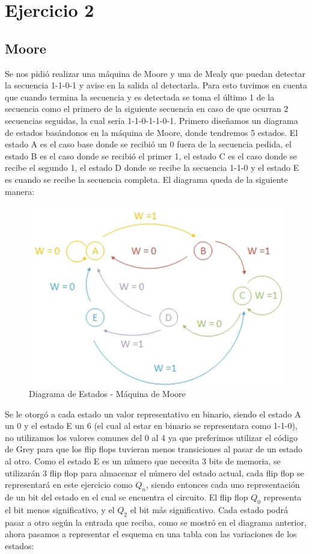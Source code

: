 \section*{Ejercicio 2}

\subsection*{Moore}
Se nos pidi\'o realizar una m\'aquina de Moore y una de Mealy que puedan detectar la secuencia 1-1-0-1 y avise en la salida al detectarla. Para esto tuvimos en cuenta que cuando termina la secuencia y es detectada se toma el \'ultimo 1 de la secuencia como el primero de la siguiente secuencia en caso de que ocurran 2 secuencias seguidas, la cual ser\'ia 1-1-0-1-1-0-1. Primero diseñamos un diagrama de estados basándonos en la m\'aquina de Moore, donde tendremos 5 estados. El estado A es el caso base donde se recibió un 0 fuera de la secuencia pedida, el estado B es el caso donde se recibió el primer 1, el estado C es el caso donde se recibe el segundo 1, el estado D donde se recibe la secuencia 1-1-0 y el estado E es cuando se recibe la secuencia completa. 
El diagrama queda de la siguiente manera:

\begin{figure}[H]
	\centering
		\includegraphics[width=14cm]{Imagenes/diagestmoore.jpg}
	\caption{Diagrama de Estados - Máquina de Moore}
	\label{2_fig0}
\end{figure}

Se le otorgó a cada estado un valor representativo en binario, siendo el estado A un 0 y el estado E un 6 (el cual al estar en binario se representara como 1-1-0), no utilizamos los valores comunes del 0 al 4 ya que preferimos utilizar el código de Grey para que los flip flops tuvieran menos transiciones al pasar de un estado al otro. Como el estado E es un número que necesita 3 bits de memoria, se utilizar\'an 3 flip flop para almacenar el número del estado actual, cada flip flop se representar\'a en este ejercicio como $Q_n$, siendo entonces cada uno representación de un bit del estado en el cual se encuentra el circuito. El flip flop $Q_0$ representa el bit menos significativo, y el $Q_2$ el bit más significativo. Cada estado podr\'a pasar a otro seg\'un la entrada que reciba, como se mostró en el diagrama anterior, ahora pasamos a representar el esquema en una tabla con las variaciones de los estados:

